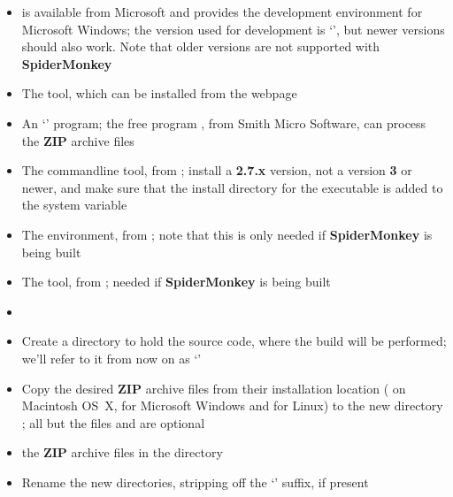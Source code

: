 \begin{itemize}
\item{} is available from Microsoft and provides the 
development environment for Microsoft Windows; the version used for development is
`', but newer versions should also work. Note that
older versions are not supported with \textbf{SpiderMonkey}
\item\exSp{} The  tool, which can be installed from the web\longDash{}page
\item\exSp{} An `' program; the free program , from
%
{Smith Micro Software}, can process the \textbf{ZIP} archive files
\item\exSp{} The  command\longDash{}line tool, from
; install a \textbf{2.7.x}
version, not a version \textbf{3} or newer, and make sure that the install directory for
the executable is added to the system  variable
\item\exSp{} The  environment, from
;
note that this is only needed if \textbf{SpiderMonkey} is being built
\item\exSp{} The  tool, from
; needed if \textbf{SpiderMonkey}
is being built
\end{itemize}
\tertiaryEnd{}
\begin{itemize}
\item\TBD{}
\end{itemize}
\tertiaryEnd{}
\secondaryEnd{}
\begin{itemize}
\item Create a directory to hold the source code, where the build will be performed; we'll
refer to it from now on as `'
\item\exSp{} Copy the desired \textbf{ZIP} archive files from their installation location
( on Macintosh OS~X, \TBD{} for Microsoft Windows and \TBD{} for
Linux) to the new directory ; all but the files
 and  are optional
\item\exSp{} the \textbf{ZIP} archive files in the directory 
\item\exSp{} Rename the new directories, stripping off the `' suffix, if
present
\end{itemize}
